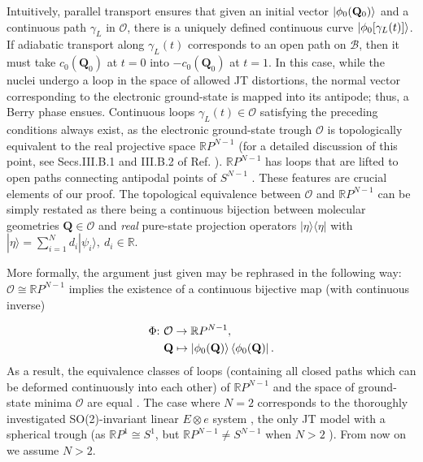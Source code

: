 \documentclass[superscriptaddress,showpacs,amsmath,amssymb,pra,twocolumn]{revtex4-1}
\begin{document}
Intuitively, parallel transport ensures that given an initial vector
$\ket{\phi_{0}(\mathbf{Q}_{0})}$ and a continuous path $\gamma_{L}$
in $\mathcal{O}$, there is a uniquely defined continuous curve $\ket{\phi_{0}[\gamma_{L}(t)]}$.
If adiabatic transport along $\gamma_{L}(t)$ corresponds to an open path on $\mathcal{B}$,
then it must take $c_{0}(\mathbf{Q}_{0})$ at $t=0$ into $-c_{0}(\mathbf{Q}_{0})$
at $t=1$. In this case, while the nuclei undergo a loop in the space
of allowed JT distortions, the normal vector corresponding to the
electronic ground-state is mapped into its antipode; thus, a Berry
phase ensues. Continuous loops $\gamma_{L}(t)\in\mathcal{O}$ satisfying
the preceding conditions always exist, as the electronic ground-state
trough $\mathcal{O}$ is topologically equivalent to the real projective
space $\mathbb{R}P^{N-1}$ \cite{ceulemans_a._structure_1987, de_los_rios_dynamical_1996,ribeiro_continuous_2017} (for a detailed discussion of this point, see Secs.III.B.1 and III.B.2 of Ref. \cite{ribeiro_continuous_2017}).
$\mathbb{R}P^{N-1}$ has loops that are lifted to open paths connecting
antipodal points of $S^{N-1}$ \cite{ceulemans_a._structure_1987,ribeiro_continuous_2017,nakahara2003geometry, lee2010introduction}.
These features are crucial elements of our proof. The topological
equivalence between $\mathcal{O}$ and $\mathbb{R}P^{N-1}$ can be
simply restated as there being a continuous bijection between molecular geometries
$\mathbf{Q}\in\mathcal{O}$ and \textit{real} pure-state projection operators $|\eta\rangle\langle\eta|$
with $|\eta\rangle=\sum_{i=1}^{N}d_{i}|\psi_{i}\rangle,~d_i \in \mathbb{R}$. 

More formally, the argument just given may be rephrased in the following
way: $\mathcal{O}\cong\mathbb{R}P^{N-1}$ \cite{ceulemans_a._structure_1987, de_los_rios_dynamical_1996, chancey1997jahn, ribeiro_continuous_2017} implies the existence of a continuous bijective map (with continuous
inverse)

\begin{align}
\text{\ensuremath{\Phi}:}~ & \mathcal{O}\rightarrow\mathbb{R}P^{N-1},\nonumber \\
 & \mathbf{Q}\mapsto\ket{\phi_{0}(\mathbf{Q})}\bra{\phi_{0}(\mathbf{Q})}.
\end{align}
As a result, the equivalence classes of loops (containing all closed
paths which can be deformed continuously into each other) of $\mathbb{R}P^{N-1}$
and the space of ground-state minima $\mathcal{O}$ are equal \cite{nakahara2003geometry,lee2010introduction}.
The case where $N=2$ corresponds to the thoroughly investigated SO(2)-invariant
linear $E\otimes e$ system \cite{longuet-higgins_studies_1958,zwanziger_topological_1987,ceulemans_berry_1991,bersuker_jahn-teller_2006},
the only JT model with a spherical trough (as $\mathbb{R}P^{1}\cong S^{1}$,
but $\mathbb{R}P^{N-1}\neq S^{N-1}$ when $N>2$ \cite{nakahara2003geometry,lee2010introduction}). From now on we assume $N>2$.
\end{document}
